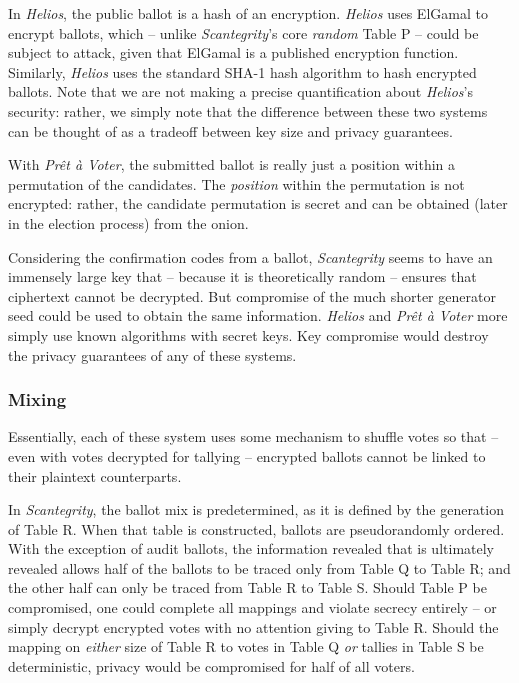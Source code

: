 \documentclass[10pt,twocolumn]{article}
\newcommand{\term}[1]{\textit{#1}}
\newcommand{\preta}{Pr\^{e}t \`{a}}
\newcommand{\pv}{\preta{} Voter}
\begin{document}
In \term{Helios}, the public ballot is a hash of an encryption. \term{Helios} uses ElGamal to encrypt ballots,
which -- unlike \term{Scantegrity}'s core \emph{random} Table P -- could be subject to attack, given that
ElGamal is a published encryption function. Similarly, \term{Helios} uses the standard SHA-1 hash algorithm
to hash encrypted ballots. Note that we are not making a precise quantification about \term{Helios}'s
security: rather, we simply note that the difference between these two systems can be thought of as
a tradeoff between key size and privacy guarantees.

With \term{\pv{}}, the submitted ballot is really just a position within a permutation of the
candidates. The \emph{position} within the permutation is not encrypted: rather, the candidate
permutation is secret and can be obtained (later in the election process) from the onion.

Considering the confirmation codes from a ballot, \term{Scantegrity} seems to have an immensely
large key that -- because it is theoretically random -- ensures that ciphertext cannot be decrypted.
But compromise of the much shorter generator seed could be used to obtain the same information.
\term{Helios} and \term{\pv{}} more simply use known algorithms with secret keys. Key compromise
would destroy the privacy guarantees of any of these systems.

\subsubsection{Mixing}

Essentially, each of these system uses some mechanism to shuffle votes so that -- even
with votes decrypted for tallying -- encrypted ballots cannot be linked to their plaintext
counterparts.

In \term{Scantegrity}, the ballot mix is predetermined, as it is defined by the generation of Table R.
When that table is constructed, ballots are pseudorandomly ordered. With the exception of audit
ballots, the information revealed that is ultimately revealed allows half of the ballots to be
traced only from Table Q to Table R; and the other half can only be traced from Table R to Table S.
Should Table P be compromised, one could complete all mappings and violate secrecy entirely -- or
simply decrypt encrypted votes with no attention giving to Table R. Should the mapping on
\emph{either} size of Table R to votes in Table Q \emph{or} tallies in Table S be deterministic,
privacy would be compromised for half of all voters.
\end{document}
